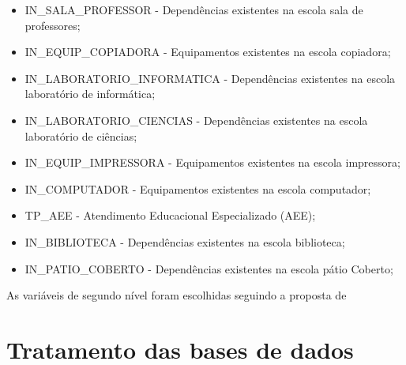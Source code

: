 \begin{itemize}
		\item IN\_SALA\_PROFESSOR - Dependências existentes na escola sala de professores;
		\item IN\_EQUIP\_COPIADORA - Equipamentos existentes na escola copiadora;
		\item IN\_LABORATORIO\_INFORMATICA - Dependências existentes na escola laboratório de informática;
		\item IN\_LABORATORIO\_CIENCIAS - Dependências existentes na escola laboratório de ciências;
		\item IN\_EQUIP\_IMPRESSORA - Equipamentos existentes na escola impressora;
		\item IN\_COMPUTADOR - Equipamentos existentes na escola computador;
		\item TP\_AEE - Atendimento Educacional Especializado (AEE);
		\item IN\_BIBLIOTECA -  Dependências existentes na escola biblioteca;
		\item IN\_PATIO\_COBERTO - Dependências existentes na escola pátio Coberto;
	\end{itemize}
	As variáveis de segundo nível foram escolhidas seguindo a proposta de 
\section{Tratamento das bases de dados}

